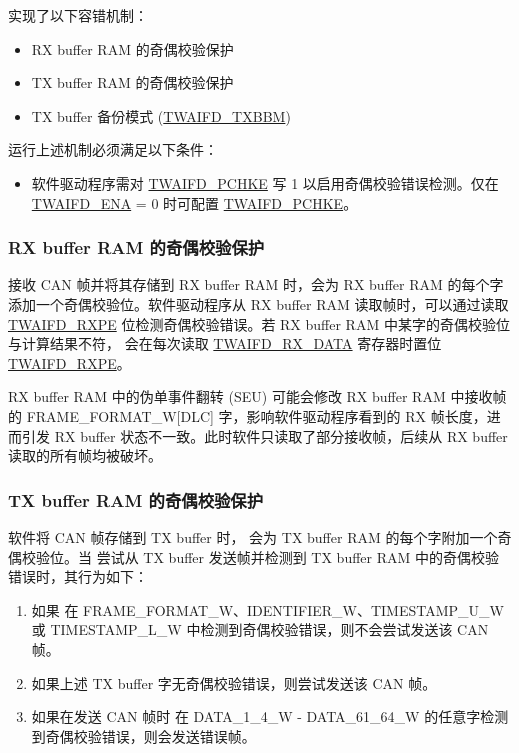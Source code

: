 \documentclass[main\_\_CN.tex]{subfiles}
\begin{document}
\modulename{} 实现了以下容错机制：

\begin{itemize}
    \item RX buffer RAM 的奇偶校验保护
    \item TX buffer RAM 的奇偶校验保护
    \item TX buffer 备份模式 (\hyperref[fielddesc:TWAIFDTXBBM]{TWAIFD\_TXBBM})
\end{itemize}

运行上述机制必须满足以下条件：

\begin{itemize}
    \item 软件驱动程序需对 \hyperref[fielddesc:TWAIFDPCHKE]{TWAIFD\_PCHKE} 写 1 以启用奇偶校验错误检测。仅在 \hyperref[fielddesc:TWAIFDENA]{TWAIFD\_ENA} = 0 时可配置 \hyperref[fielddesc:TWAIFDPCHKE]{TWAIFD\_PCHKE}。
\end{itemize}

\subsubsection{RX buffer RAM 的奇偶校验保护}

\modulename{} 接收 CAN 帧并将其存储到 RX buffer RAM 时，会为 RX buffer RAM 的每个字添加一个奇偶校验位。软件驱动程序从 RX buffer RAM 读取帧时，可以通过读取 \hyperref[fielddesc:TWAIFDRXPE]{TWAIFD\_RXPE} 位检测奇偶校验错误。若 RX buffer RAM 中某字的奇偶校验位与计算结果不符，\modulename{} 会在每次读取 \hyperref[regdesc:TWAIFDRXDATAREG]{TWAIFD\_RX\_DATA} 寄存器时置位 \hyperref[fielddesc:TWAIFDRXPE]{TWAIFD\_RXPE}。

RX buffer RAM 中的伪单事件翻转 (SEU) 可能会修改 RX buffer RAM 中接收帧的 FRAME\_FORMAT\_W[DLC] 字，影响软件驱动程序看到的 RX 帧长度，进而引发 RX buffer 状态不一致。此时软件只读取了部分接收帧，后续从 RX buffer 读取的所有帧均被破坏。


\subsubsection{TX buffer RAM 的奇偶校验保护}
\label{sec:twai-parity-protect-tx-buffer}

软件将 CAN 帧存储到 TX buffer 时，\modulename{} 会为 TX buffer RAM 的每个字附加一个奇偶校验位。当 \modulename{} 尝试从 TX buffer 发送帧并检测到 TX buffer RAM 中的奇偶校验错误时，其行为如下：

\begin{enumerate}
    \item 如果 \modulename{} 在 FRAME\_FORMAT\_W、IDENTIFIER\_W、TIMESTAMP\_U\_W 或 TIMESTAMP\_L\_W 中检测到奇偶校验错误，则不会尝试发送该 CAN 帧。
    \item 如果上述 TX buffer 字无奇偶校验错误，则尝试发送该 CAN 帧。
    \item 如果在发送 CAN 帧时 \modulename{} 在 DATA\_1\_4\_W - DATA\_61\_64\_W 的任意字检测到奇偶校验错误，则会发送错误帧。
\end{enumerate}
\end{document}

